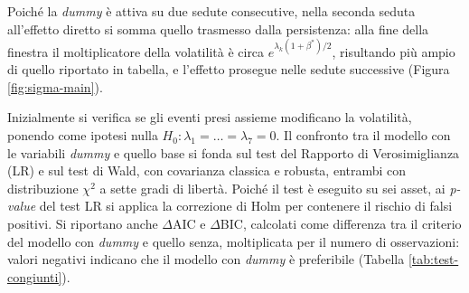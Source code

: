 Poiché la \emph{dummy} è attiva su due sedute consecutive, nella seconda seduta all'effetto diretto si somma quello trasmesso dalla persistenza: alla fine della finestra 
il moltiplicatore della volatilità è circa $e^{\lambda_k(1+\beta^*)/2}$, risultando più ampio di quello riportato in tabella, e l'effetto prosegue nelle sedute successive 
(Figura \ref{fig:sigma-main}).

Inizialmente si verifica se gli eventi presi assieme modificano la volatilità, ponendo come ipotesi nulla $H_0: \lambda_1 = \dots = \lambda_7 = 0$. Il confronto tra il 
modello con le variabili \emph{dummy} e quello base si fonda sul test del Rapporto di Verosimiglianza (LR) e sul test di Wald, con covarianza classica e robusta, 
entrambi con distribuzione $\chi^2$ a sette gradi di libertà. Poiché il test è eseguito su sei asset, ai \emph{p-value} del test LR si applica la correzione di Holm per 
contenere il rischio di falsi positivi. Si riportano anche $\Delta$AIC e $\Delta$BIC, calcolati come differenza tra il criterio del modello con \emph{dummy} e quello senza, 
moltiplicata per il numero di osservazioni: valori negativi indicano che il modello con \emph{dummy} è preferibile (Tabella \ref{tab:test-congiunti}).

